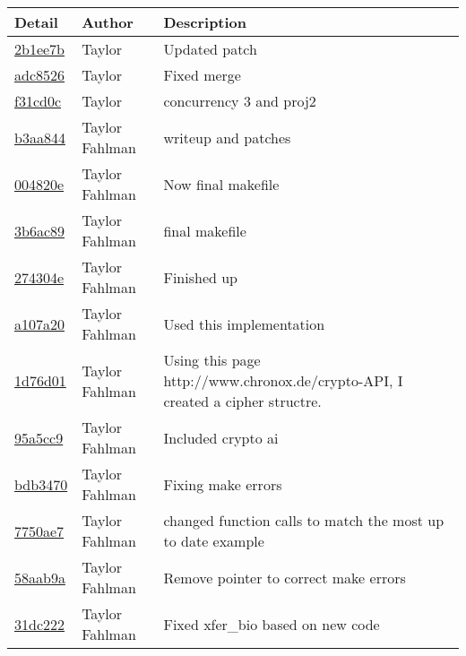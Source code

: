 \begin{tabular}{l l l}\textbf{Detail} & \textbf{Author} & \textbf{Description}\\\hline
\href{git@github.com:fahlmant/cs444/commit/2b1ee7b6f20b8ea3ad63878a841176506f05edfb}{2b1ee7b} & Taylor & Updated patch\\\hline
\href{git@github.com:fahlmant/cs444/commit/adc8526788f070bd5ae5d35d226cfa786c288639}{adc8526} & Taylor & Fixed merge\\\hline
\href{git@github.com:fahlmant/cs444/commit/f31cd0cf2d1ede588ac1e5ee284bd6c0a2bba488}{f31cd0c} & Taylor & concurrency 3 and proj2\\\hline
\href{git@github.com:fahlmant/cs444/commit/b3aa8442d161887dfb6a0916a8308e191390ec06}{b3aa844} & Taylor Fahlman & writeup and patches\\\hline
\href{git@github.com:fahlmant/cs444/commit/004820e9120570f2fa0627732e0de21668eaed13}{004820e} & Taylor Fahlman & Now final makefile\\\hline
\href{git@github.com:fahlmant/cs444/commit/3b6ac89e287e3eaca2b3cb1f7aca8094c2c9bf5c}{3b6ac89} & Taylor Fahlman & final makefile\\\hline
\href{git@github.com:fahlmant/cs444/commit/274304e04de3ce8f0b5e485445ff16700a98b0b0}{274304e} & Taylor Fahlman & Finished up\\\hline
\href{git@github.com:fahlmant/cs444/commit/a107a206c3be4de2a7aee2b657ae7a98eb04a68a}{a107a20} & Taylor Fahlman & Used this implementation\\\hline
\href{git@github.com:fahlmant/cs444/commit/1d76d01de43b06dbe9dab7951763ed1848c9e6c8}{1d76d01} & Taylor Fahlman & Using this page http://www.chronox.de/crypto-API, I created a cipher structre.\\\hline
\href{git@github.com:fahlmant/cs444/commit/95a5cc9c095e5a588b9813ad579cc838c5f142f7}{95a5cc9} & Taylor Fahlman & Included crypto ai\\\hline
\href{git@github.com:fahlmant/cs444/commit/bdb34702a8d5df714e0d60f94ad42670a1d9e2a6}{bdb3470} & Taylor Fahlman & Fixing make errors\\\hline
\href{git@github.com:fahlmant/cs444/commit/7750ae7de8401e83a4a038af4ae1db2884a9e71e}{7750ae7} & Taylor Fahlman & changed function calls to match the most up to date example\\\hline
\href{git@github.com:fahlmant/cs444/commit/58aab9ac4d09ff701e74675e4c780d8175c93bad}{58aab9a} & Taylor Fahlman & Remove pointer to correct make errors\\\hline
\href{git@github.com:fahlmant/cs444/commit/31dc2229f379fc0465c67536249135c513a75807}{31dc222} & Taylor Fahlman & Fixed xfer_bio based on new code\\\hline

\end{tabular}
